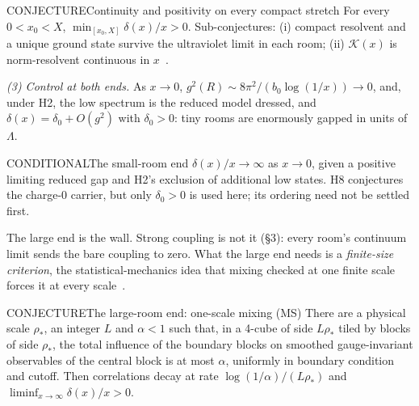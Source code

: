 \begin{claim}{CONJECTURE}{Continuity and positivity on every compact stretch}\label{b:compact}
For every $0<x_0<X$, $\min_{[x_0,X]}\delta(x)/x>0$. Sub-conjectures: (i) compact resolvent and a unique ground state
survive the ultraviolet limit in each room; (ii) $\mathcal K(x)$ is norm-resolvent continuous in $x$~\cite{Kato}.
\end{claim}

\emph{(3) Control at both ends.} As $x\to0$, $g^2(R)\sim8\pi^2/(b_0\log(1/x))\to0$, and, under H2, the low spectrum is the reduced model
dressed, and $\delta(x)=\delta_0+O(g^2)$ with $\delta_0>0$: tiny rooms are enormously gapped in units of $\Lambda$.

\begin{claim}{CONDITIONAL}{The small-room end}\label{b:smallend}
$\delta(x)/x\to\infty$ as $x\to0$, given a positive limiting reduced gap and H2's exclusion of additional low states.
H8 conjectures the charge-0 carrier, but only $\delta_0>0$ is used here; its ordering need not be settled first.
\end{claim}

The large end is the wall. Strong coupling is not it (\S3): every room's continuum limit sends the bare coupling to zero.
What the large end needs is a \emph{finite-size criterion}, the statistical-mechanics idea that mixing checked at one
finite scale forces it at every scale~\cite{DobrushinShlosman85,MartinelliOlivieri94}.

\begin{claim}{CONJECTURE}{The large-room end: one-scale mixing (MS)}\label{b:ms}
There are a physical scale $\rho_*$, an integer $L$ and $\alpha<1$ such that, in a 4-cube of side $L\rho_*$ tiled by
blocks of side $\rho_*$, the total influence of the boundary blocks on smoothed gauge-invariant observables of the central
block is at most $\alpha$, uniformly in boundary condition and cutoff. Then correlations decay at rate
$\log(1/\alpha)/(L\rho_*)$ and $\liminf_{x\to\infty}\delta(x)/x>0$.
\end{claim}

